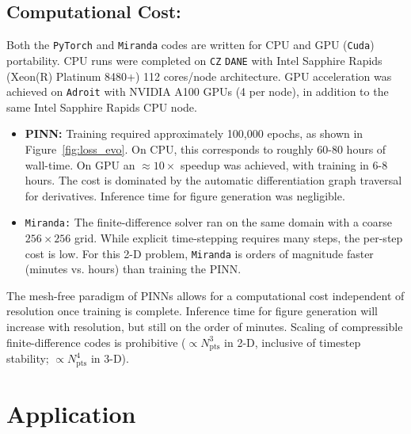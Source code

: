 \documentclass{homework}
\begin{document}
\subsection*{Computational Cost: \qquad}
Both the \texttt{PyTorch} and \texttt{Miranda} codes are written for CPU and GPU (\texttt{Cuda}) portability. CPU runs were completed on \texttt{CZ} \texttt{DANE} with Intel Sapphire Rapids (Xeon(R) Platinum 8480+) 112 cores/node architecture. GPU acceleration was achieved on \texttt{Adroit} with NVIDIA A100 GPUs (4 per node), in addition to the same Intel Sapphire Rapids CPU node.
\begin{itemize}
    \item \textbf{PINN:} Training required approximately 100,000 epochs, as shown in Figure~\ref{fig:loss_evo}. On CPU, this corresponds to roughly 60-80 hours of wall-time. On GPU an $\approx 10 \times$ speedup was achieved, with training in 6-8 hours. The cost is dominated by the automatic differentiation graph traversal for derivatives. Inference time for figure generation was negligible.
    \item \texttt{Miranda:} The finite-difference solver ran on the same domain with a coarse $256 \times 256$ grid. While explicit time-stepping requires many steps, the per-step cost is low. For this 2-D problem, \texttt{Miranda} is orders of magnitude faster (minutes vs. hours) than training the PINN.
\end{itemize}
The mesh-free paradigm of PINNs allows for a computational cost independent of resolution once training is complete. Inference time for figure generation will increase with resolution, but still on the order of minutes. Scaling of compressible finite-difference codes is prohibitive ($\propto N_\mathrm{pts}^3$ in 2-D, inclusive of timestep stability; $\propto N_\mathrm{pts}^4$ in 3-D).

\section{Application}
\end{document}
